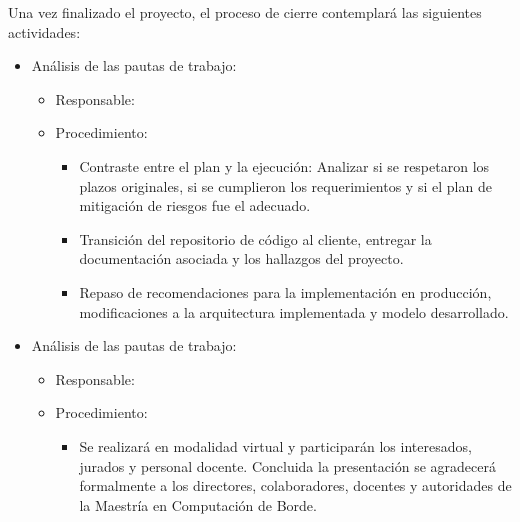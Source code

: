 \documentclass[
11pt, %
]{charter}
\begin{document}
Una vez finalizado el proyecto, el proceso de cierre contemplará las siguientes actividades:
\begin{itemize}
	\item Análisis de las pautas de trabajo:
	\begin{itemize}
		\item[] Responsable: \authorname
		\item[] Procedimiento:
		\begin{itemize}
			\item Contraste entre el plan y la ejecución: Analizar si se respetaron los plazos originales, si se cumplieron los requerimientos y si el plan de mitigación de riesgos fue el adecuado.
			\item Transición del repositorio de código al cliente, entregar la documentación asociada y los hallazgos del proyecto.
			\item Repaso de recomendaciones para la implementación en producción, modificaciones a la arquitectura implementada y modelo desarrollado.
		\end{itemize}
	\end{itemize}
		\item Análisis de las pautas de trabajo:
	\begin{itemize}
		\item[] Responsable: \authorname
		\item[] Procedimiento:
		\begin{itemize}
			\item Se realizará en modalidad virtual y participarán los interesados, jurados y personal docente. Concluida la presentación se agradecerá formalmente a los directores, colaboradores, docentes y autoridades de la Maestría en Computación de Borde.

		\end{itemize}
		\end{itemize}
\end{itemize}
\end{document}
